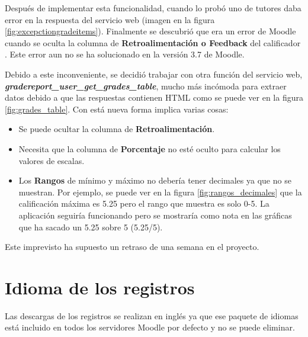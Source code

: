 
Después de implementar esta funcionalidad, cuando lo probó uno de tutores daba error en la respuesta del servicio web (imagen en la figura \ref{fig:excepctiongradeitems}). Finalmente se descubrió que era un error de Moodle cuando se oculta la columna de \textbf{Retroalimentación o Feedback} del calificador \cite{zadok_[mdl-64298]_nodate}. Este error aun no se ha solucionado en la versión 3.7 de Moodle.  


Debido a este inconveniente, se decidió trabajar con otra función del servicio web, \textbf{\textit{gradereport\_user\_get\_grades\_table}}, mucho más incómoda para extraer datos debido a que las respuestas contienen HTML como se puede ver en la figura \ref{fig:grades_table}. Con está nueva forma implica varias cosas:
\begin{itemize}
	\item Se puede ocultar la columna de \textbf{Retroalimentación}.
	\item Necesita que la columna de \textbf{Porcentaje} no esté oculto para calcular los valores de escalas.
	\item Los \textbf{Rangos} de mínimo y máximo no debería tener decimales ya que no se muestran. Por ejemplo, se puede ver en la figura \ref{fig:rangos_decimales} que la calificación máxima es 5.25 pero el rango que muestra es solo 0-5. La aplicación seguiría funcionando pero se mostraría como nota en las gráficas que ha sacado un 5.25 sobre 5 (5.25/5).
\end{itemize}

Este imprevisto ha supuesto un retraso de una semana en el proyecto.


\section{Idioma de los registros}
Las descargas de los registros se realizan en inglés ya que ese paquete de idiomas está incluido en todos los servidores Moodle por defecto y no se puede eliminar.

